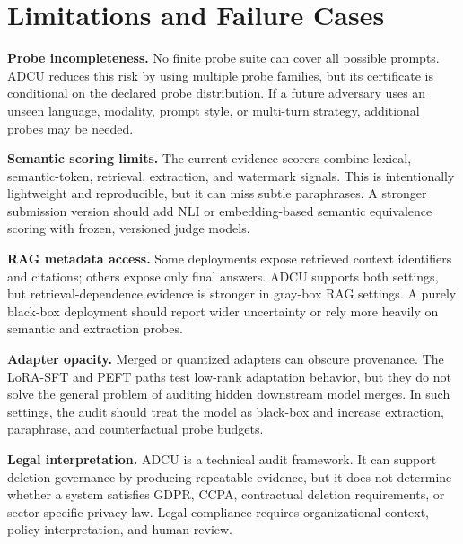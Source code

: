 \documentclass[10pt,journal,compsoc]{IEEEtran}
\newcommand{\method}{ADCU}
\begin{document}
\section{Limitations and Failure Cases}

\textbf{Probe incompleteness.}
No finite probe suite can cover all possible prompts. \method{} reduces this risk by using multiple probe families, but its certificate is conditional on the declared probe distribution. If a future adversary uses an unseen language, modality, prompt style, or multi-turn strategy, additional probes may be needed.

\textbf{Semantic scoring limits.}
The current evidence scorers combine lexical, semantic-token, retrieval, extraction, and watermark signals. This is intentionally lightweight and reproducible, but it can miss subtle paraphrases. A stronger submission version should add NLI or embedding-based semantic equivalence scoring with frozen, versioned judge models.

\textbf{RAG metadata access.}
Some deployments expose retrieved context identifiers and citations; others expose only final answers. \method{} supports both settings, but retrieval-dependence evidence is stronger in gray-box RAG settings. A purely black-box deployment should report wider uncertainty or rely more heavily on semantic and extraction probes.

\textbf{Adapter opacity.}
Merged or quantized adapters can obscure provenance. The LoRA-SFT and PEFT paths test low-rank adaptation behavior, but they do not solve the general problem of auditing hidden downstream model merges. In such settings, the audit should treat the model as black-box and increase extraction, paraphrase, and counterfactual probe budgets.

\textbf{Legal interpretation.}
\method{} is a technical audit framework. It can support deletion governance by producing repeatable evidence, but it does not determine whether a system satisfies GDPR, CCPA, contractual deletion requirements, or sector-specific privacy law. Legal compliance requires organizational context, policy interpretation, and human review.
\end{document}
